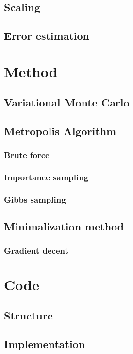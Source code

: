 \documentclass[norsk,a4paper,12pt]{article}
\begin{document}
\subsection{Scaling}

\subsection{Error estimation}

\section{Method}

\subsection{Variational Monte Carlo}
\subsection{Metropolis Algorithm}
\subsubsection{Brute force}
\subsubsection{Importance sampling}
\subsubsection{Gibbs sampling}

\subsection{Minimalization method}
\subsubsection{Gradient decent}

\section{Code}
\subsection{Structure}
\subsection{Implementation}
\end{document}

